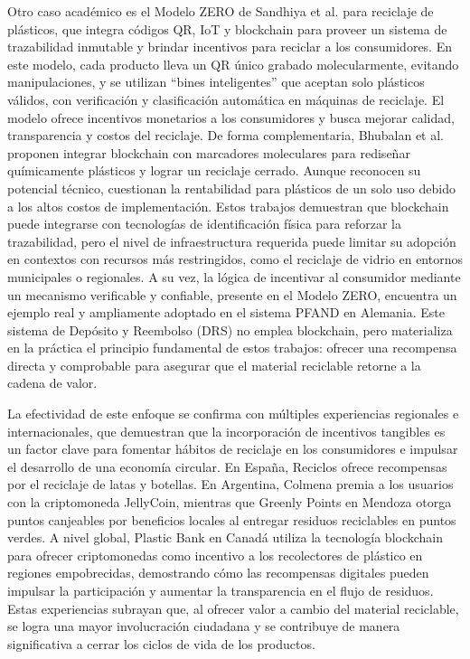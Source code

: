 Otro caso académico es el Modelo ZERO de Sandhiya et al. \cite{sandhiya2020investigating} para reciclaje de plásticos, que integra códigos QR, IoT y blockchain para proveer un sistema de trazabilidad inmutable y brindar incentivos para reciclar a los consumidores. En este modelo, cada producto lleva un QR único grabado molecularmente, evitando manipulaciones, y se utilizan ``bines inteligentes'' que aceptan solo plásticos válidos, con verificación y clasificación automática en máquinas de reciclaje. El modelo ofrece incentivos monetarios a los consumidores y busca mejorar calidad, transparencia y costos del reciclaje. De forma complementaria, Bhubalan et al. \cite{BHUBALAN2022113631} proponen integrar blockchain con marcadores moleculares para rediseñar químicamente plásticos y lograr un reciclaje cerrado. Aunque reconocen su potencial técnico, cuestionan la rentabilidad para plásticos de un solo uso debido a los altos costos de implementación. Estos trabajos demuestran que blockchain puede integrarse con tecnologías de identificación física para reforzar la trazabilidad, pero el nivel de infraestructura requerida puede limitar su adopción en contextos con recursos más restringidos, como el reciclaje de vidrio en entornos municipales o regionales. A su vez, la lógica de incentivar al consumidor mediante un mecanismo verificable y confiable, presente en el Modelo ZERO, encuentra un ejemplo real y ampliamente adoptado en el sistema PFAND en Alemania. Este sistema de Depósito y Reembolso (DRS) no emplea blockchain, pero materializa en la práctica el principio fundamental de estos trabajos: ofrecer una recompensa directa y comprobable para asegurar que el material reciclable retorne a la cadena de valor.

La efectividad de este enfoque se confirma con múltiples experiencias regionales e internacionales, que demuestran que la incorporación de incentivos tangibles es un factor clave para fomentar hábitos de reciclaje en los consumidores e impulsar el desarrollo de una economía circular. En España, Reciclos \cite{reciclos2024} ofrece recompensas por el reciclaje de latas y botellas. En Argentina, Colmena \cite{colmena2024} premia a los usuarios con la criptomoneda JellyCoin, mientras que Greenly Points \cite{greenlypoints2024} en Mendoza otorga puntos canjeables por beneficios locales al entregar residuos reciclables en puntos verdes. A nivel global, Plastic Bank en Canadá utiliza la tecnología blockchain para ofrecer criptomonedas como incentivo a los recolectores de plástico en regiones empobrecidas, demostrando cómo las recompensas digitales pueden impulsar la participación y aumentar la transparencia en el flujo de residuos. Estas experiencias subrayan que, al ofrecer valor a cambio del material reciclable, se logra una mayor involucración ciudadana y se contribuye de manera significativa a cerrar los ciclos de vida de los productos.

